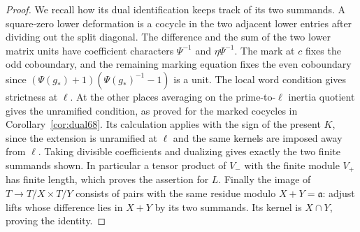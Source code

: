\documentclass[a4paper,11pt]{article}
\theoremstyle{definition}
\theoremstyle{remark}
\numberwithin{equation}{section}
\begin{document}
\begin{proof}
We recall how its dual identification keeps track of its two
summands. A square-zero lower deformation is a cocycle in
the two adjacent lower entries after dividing out the split
diagonal. The difference and the sum of the two lower matrix
units have coefficient characters \(\Psi^{-1}\) and
\(\eta\Psi^{-1}\). The mark at \(c\) fixes the odd coboundary,
and the remaining marking equation fixes the even coboundary
since \((\Psi(g_*)+1)(\Psi(g_*)^{-1}-1)\) is a unit.
The local word condition gives strictness at \(\ell\). At
the other places averaging on the prime-to-\(\ell\) inertia
quotient gives the unramified condition, as proved for the
marked cocycles in Corollary~\ref{cor:dual68}. Its calculation
applies with the sign of the present \(K\), since the extension is
unramified at \(\ell\) and the same kernels are imposed
away from \(\ell\). Taking divisible coefficients and dualizing
gives exactly the two finite summands shown. In particular a
tensor product of \(V_-\) with the finite module \(V_+\) has
finite length, which proves the assertion for \(L\).
Finally the image of \(T\to T/X\times T/Y\) consists of pairs
with the same residue modulo \(X+Y=\mathfrak a\): adjust lifts
whose difference lies in \(X+Y\) by its two summands.
Its kernel is \(X\cap Y\), proving the identity.
\end{proof}
\end{document}
